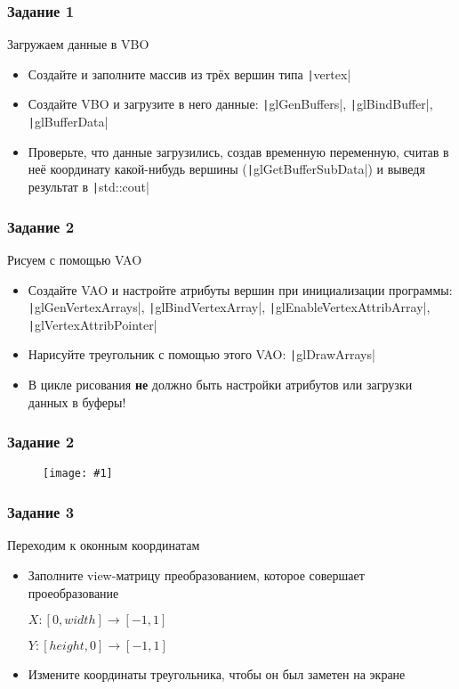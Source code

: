 \documentclass[10pt]{beamer}
\newcommand{\slideimage}[1]{
  \begin{figure}
    \begin{adjustbox}{width=\textwidth, totalheight=\textheight-2\baselineskip-2\baselineskip,keepaspectratio}
      \texttt{[image: \#1]}
    \end{adjustbox}
  \end{figure}
}
\begin{document}
\begin{frame}[fragile]
\frametitle{Задание 1}
Загружаем данные в VBO
\begin{itemize}
\item Создайте и заполните массив из трёх вершин типа \texttt|vertex|
\item Создайте VBO и загрузите в него данные: \texttt|glGenBuffers|, \texttt|glBindBuffer|, \texttt|glBufferData|
\item Проверьте, что данные загрузились, создав временную переменную, считав в неё координату какой-нибудь вершины (\texttt|glGetBufferSubData|) и выведя результат в \texttt|std::cout|
\end{itemize}
\end{frame}

\begin{frame}[fragile]
\frametitle{Задание 2}
Рисуем с помощью VAO
\begin{itemize}
\item Создайте VAO и настройте атрибуты вершин при инициализации программы: \texttt|glGenVertexArrays|, \texttt|glBindVertexArray|, \texttt|glEnableVertexAttribArray|, \texttt|glVertexAttribPointer|
\item Нарисуйте треугольник с помощью этого VAO: \texttt|glDrawArrays|
\item В цикле рисования \textbf{\alert{не}} должно быть настройки атрибутов или загрузки данных в буферы!
\end{itemize}
\end{frame}

\begin{frame}
\frametitle{Задание 2}
\slideimage{2.png}
\end{frame}

\begin{frame}[fragile]
\frametitle{Задание 3}
Переходим к оконным координатам
\begin{itemize}
\item Заполните view-матрицу преобразованием, которое совершает проеобразование

\begin{center}
\begin{math}
X: [0, width] \rightarrow [-1, 1]
\end{math}

\begin{math}
Y: [height, 0] \rightarrow [-1, 1]
\end{math}
\end{center}

\item Измените координаты треугольника, чтобы он был заметен на экране
\end{itemize}
\end{frame}
\end{document}
